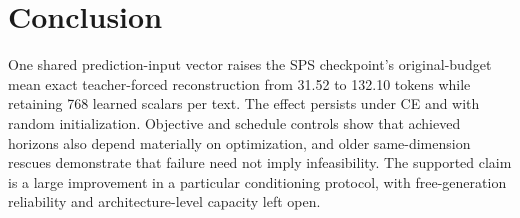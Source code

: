\documentclass{article}
\begin{document}
\section{Conclusion}

One shared prediction-input vector raises the SPS checkpoint's original-budget mean exact teacher-forced reconstruction from 31.52 to 132.10 tokens while retaining 768 learned scalars per text.
The effect persists under CE and with random initialization.
Objective and schedule controls show that achieved horizons also depend materially on optimization, and older same-dimension rescues demonstrate that failure need not imply infeasibility.
The supported claim is a large improvement in a particular conditioning protocol, with free-generation reliability and architecture-level capacity left open.




\appendix

\end{document}

